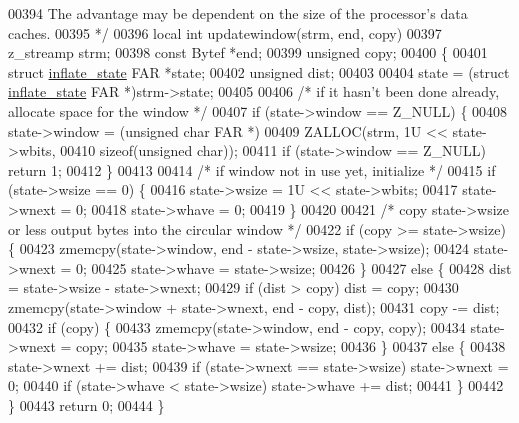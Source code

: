 \begin{DoxyCode}
{{{{00394 \textcolor{comment}{   The advantage may be dependent on the size of the processor's data caches.}
00395 \textcolor{comment}{ */}
00396 local \textcolor{keywordtype}{int} updatewindow(strm, end, copy)
00397 z\_streamp strm;
00398 \textcolor{keyword}{const} Bytef *end;
00399 \textcolor{keywordtype}{unsigned} copy;
00400 \{
00401     \textcolor{keyword}{struct }\hyperlink{structinflate__state}{inflate\_state} FAR *state;
00402     \textcolor{keywordtype}{unsigned} dist;
00403 
00404     state = (\textcolor{keyword}{struct }\hyperlink{structinflate__state}{inflate\_state} FAR *)strm->state;
00405 
00406     \textcolor{comment}{/* if it hasn't been done already, allocate space for the window */}
00407     if (state->window == Z\_NULL) \{
00408         state->window = (\textcolor{keywordtype}{unsigned} \textcolor{keywordtype}{char} FAR *)
00409                         ZALLOC(strm, 1U << state->wbits,
00410                                \textcolor{keyword}{sizeof}(\textcolor{keywordtype}{unsigned} \textcolor{keywordtype}{char}));
00411         \textcolor{keywordflow}{if} (state->window == Z\_NULL) \textcolor{keywordflow}{return} 1;
00412     \}
00413 
00414     \textcolor{comment}{/* if window not in use yet, initialize */}
00415     \textcolor{keywordflow}{if} (state->wsize == 0) \{
00416         state->wsize = 1U << state->wbits;
00417         state->wnext = 0;
00418         state->whave = 0;
00419     \}
00420 
00421     \textcolor{comment}{/* copy state->wsize or less output bytes into the circular window */}
00422     \textcolor{keywordflow}{if} (copy >= state->wsize) \{
00423         zmemcpy(state->window, end - state->wsize, state->wsize);
00424         state->wnext = 0;
00425         state->whave = state->wsize;
00426     \}
00427     \textcolor{keywordflow}{else} \{
00428         dist = state->wsize - state->wnext;
00429         \textcolor{keywordflow}{if} (dist > copy) dist = copy;
00430         zmemcpy(state->window + state->wnext, end - copy, dist);
00431         copy -= dist;
00432         \textcolor{keywordflow}{if} (copy) \{
00433             zmemcpy(state->window, end - copy, copy);
00434             state->wnext = copy;
00435             state->whave = state->wsize;
00436         \}
00437         \textcolor{keywordflow}{else} \{
00438             state->wnext += dist;
00439             \textcolor{keywordflow}{if} (state->wnext == state->wsize) state->wnext = 0;
00440             \textcolor{keywordflow}{if} (state->whave < state->wsize) state->whave += dist;
00441         \}
00442     \}
00443     \textcolor{keywordflow}{return} 0;
00444 \}
}}}}
\end{DoxyCode}
